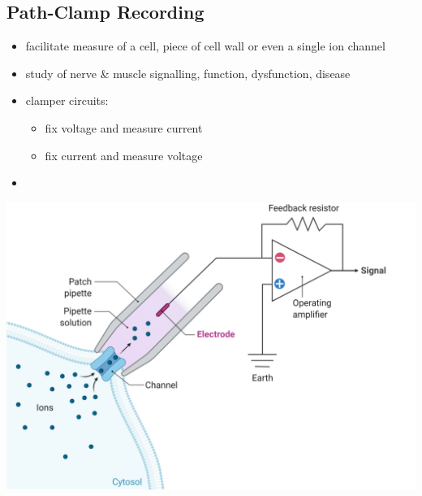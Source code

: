 \documentclass[11pt,fleqn]{book}
\begin{document}
\subsection{Path-Clamp Recording}
\begin{itemize}
    \item facilitate measure of a cell, piece of cell wall or even a single ion channel
    \item study of nerve \& muscle signalling, function, dysfunction, disease
    \item clamper circuits:
    \begin{itemize}
        \item fix voltage and measure current
        \item fix current and measure voltage
    \end{itemize}
    \item 
\end{itemize}
\begin{center}
    \includegraphics[width=0.65\linewidth]{Pictures/Screenshot 2024-02-25 214256.png}
\end{center}
\end{document}
